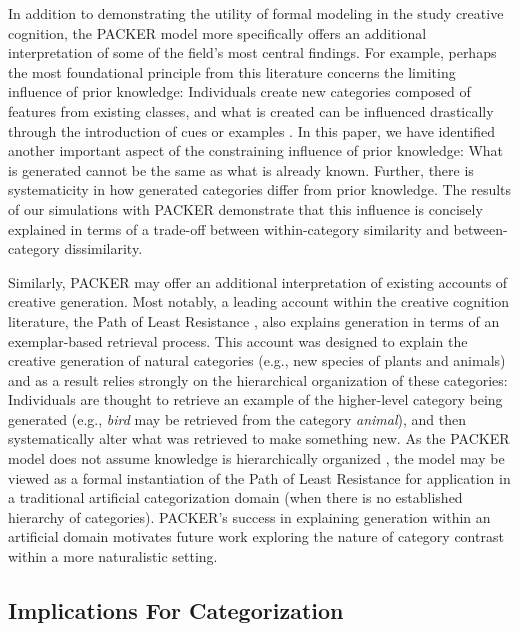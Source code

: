 \documentclass[12pt]{article}
\begin{document}
\begin{flushleft}
In addition to demonstrating the utility of formal modeling in the study creative cognition, the PACKER model more specifically offers an additional interpretation of some of the field's most central findings. For example, perhaps the most foundational principle from this literature concerns the limiting influence of prior knowledge: Individuals create new categories composed of features from existing classes, and what is created can be influenced drastically through the introduction of cues or examples \citep{marsh1999inadvertent,smith1993constraining}. In this paper, we have identified another important aspect of the constraining influence of prior knowledge: What is generated cannot be the same as what is already known. Further, there is systematicity in how generated categories differ from prior knowledge. The results of our simulations with PACKER demonstrate that this influence is concisely explained in terms of a trade-off between within-category similarity and between-category dissimilarity.

Similarly, PACKER may offer an additional interpretation of existing accounts of creative generation. Most notably, a leading account within the creative cognition literature, the Path of Least Resistance \citep{ward1994structured,ward1995s}, also explains generation in terms of an exemplar-based retrieval process. This account was designed to explain the creative generation of natural categories (e.g., new species of plants and animals) and as a result relies strongly on the hierarchical organization of these categories: Individuals are thought to retrieve an example of the higher-level category being generated (e.g., \textit{bird} may be retrieved from the category \textit{animal}), and then systematically alter what was retrieved to make something new. As the PACKER model does not assume knowledge is hierarchically organized \citep[this is true of the exemplar view more broadly, see][]{murphy2016exemplar}, the model may be viewed as a formal instantiation of the Path of Least Resistance for application in a traditional artificial categorization domain (when there is no established hierarchy of categories). PACKER's success in explaining generation within an artificial domain motivates future work exploring the nature of category contrast within a more naturalistic setting.

\subsection{Implications For Categorization}


\end{flushleft}
\end{document}
